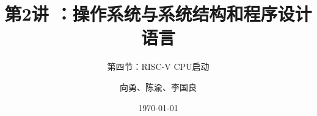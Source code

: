 


\title[第2讲]{第2讲 ：操作系统与系统结构和程序设计语言} %
\subtitle{第四节：RISC-V CPU启动}
\author{向勇、陈渝、李国良} %
\date{\today} %



\begin{frame}
\titlepage %
\end{frame}




